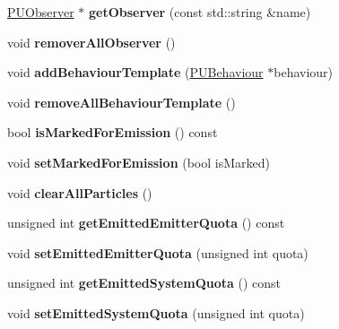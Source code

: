 \begin{DoxyCompactItemize}
\hyperlink{classPUObserver}{P\+U\+Observer} $\ast$ {\bfseries get\+Observer} (const std\+::string \&name)
\item 
\mbox{\label{classPUParticleSystem3D_a0d56d54d543d6b4969b9f0017ce0ecbe}} 
void {\bfseries remover\+All\+Observer} ()
\item 
\mbox{\label{classPUParticleSystem3D_a090d2d771bf87a7ea4cd28728c183018}} 
void {\bfseries add\+Behaviour\+Template} (\hyperlink{classPUBehaviour}{P\+U\+Behaviour} $\ast$behaviour)
\item 
\mbox{\label{classPUParticleSystem3D_ad2265c6d11cb97200536c50e0e1439c7}} 
void {\bfseries remove\+All\+Behaviour\+Template} ()
\item 
\mbox{\label{classPUParticleSystem3D_aacefdc56340a474eba3fb574f0450213}} 
bool {\bfseries is\+Marked\+For\+Emission} () const
\item 
\mbox{\label{classPUParticleSystem3D_a0c58271109897c6960d1da7b8352b957}} 
void {\bfseries set\+Marked\+For\+Emission} (bool is\+Marked)
\item 
\mbox{\label{classPUParticleSystem3D_af624e8deb5f00cda34df04b15b6c8db6}} 
void {\bfseries clear\+All\+Particles} ()
\item 
\mbox{\label{classPUParticleSystem3D_a8a52d90c8ba2d92aad7890b156e4bb0c}} 
unsigned int {\bfseries get\+Emitted\+Emitter\+Quota} () const
\item 
\mbox{\label{classPUParticleSystem3D_a48c8c01e2e7f1d9a01dc76cac2a64dcb}} 
void {\bfseries set\+Emitted\+Emitter\+Quota} (unsigned int quota)
\item 
\mbox{\label{classPUParticleSystem3D_a782a5d0d9b6ce367916f485232b5c443}} 
unsigned int {\bfseries get\+Emitted\+System\+Quota} () const
\item 
\mbox{\label{classPUParticleSystem3D_a3fbccda2071b4959f98ceeafd6335ae0}} 
void {\bfseries set\+Emitted\+System\+Quota} (unsigned int quota)

\end{DoxyCompactItemize}
